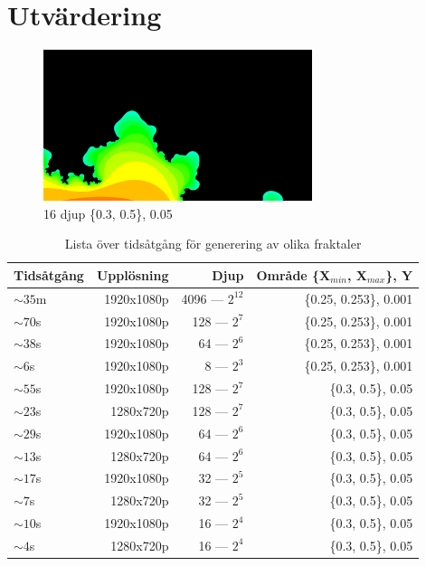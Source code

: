 \documentclass[a4paper, 11pt]{article}
\begin{document}
\section{Utvärdering}

\begin{figure}[h!]
  \centering
    \includegraphics[width=0.7\textwidth]{1080p16zoneb}
  \caption{16 djup \{0.3, 0.5\}, 0.05}
  \label{fig:B16d}
\end{figure}

\begin{table}[h]
\centering
\begin{tabular}{|l|r|r|r|}  
\hline
Tidsåtgång & Upplösning & Djup & Område \{X$_{min}$, X$_{max}$\}, Y\\
\hline
$\sim35$m & 1920x1080p & 4096 --- $2^{12}$ & \{0.25, 0.253\}, 0.001\\
\hline
$\sim70$s & 1920x1080p & 128 --- $2^7$ & \{0.25, 0.253\}, 0.001\\
\hline
$\sim38$s & 1920x1080p & 64 --- $2^6$ & \{0.25, 0.253\}, 0.001\\
\hline
$\sim6$s & 1920x1080p & 8 --- $2^3$ & \{0.25, 0.253\}, 0.001\\
\hline
$\sim55$s & 1920x1080p & 128 --- $2^7$ & \{0.3, 0.5\}, 0.05\\
\hline
$\sim23$s & 1280x720p & 128 --- $2^7$ & \{0.3, 0.5\}, 0.05\\
\hline
$\sim29$s & 1920x1080p & 64 --- $2^6$ & \{0.3, 0.5\}, 0.05\\
\hline
$\sim13$s & 1280x720p & 64 --- $2^6$ & \{0.3, 0.5\}, 0.05\\
\hline
$\sim17$s & 1920x1080p & 32 --- $2^5$ & \{0.3, 0.5\}, 0.05\\
\hline
$\sim7$s & 1280x720p & 32 --- $2^5$ & \{0.3, 0.5\}, 0.05\\
\hline
$\sim10$s & 1920x1080p & 16 --- $2^4$ & \{0.3, 0.5\}, 0.05\\
\hline
$\sim4$s & 1280x720p & 16 --- $2^4$ & \{0.3, 0.5\}, 0.05\\
\hline
\end{tabular}
\caption{Lista över tidsåtgång för generering av olika fraktaler}
\label{tab:timer}
\end{table}
\end{document}

